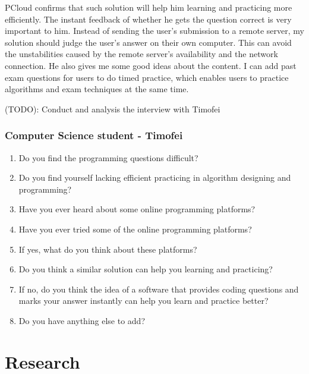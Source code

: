 \documentclass[a4paper]{report}
\begin{document}
PCloud confirms that such solution will help him learning and practicing more efficiently. The instant feedback of whether he gets the question correct is very important to him. Instead of sending the user's submission to a remote server, my solution should judge the user's answer on their own computer. This can avoid the unstabilities caused by the remote server's availability and the network connection. He also gives me some good ideas about the content. I can add past exam questions for users to do timed practice, which enables users to practice algorithms and exam techniques at the same time.

(TODO): Conduct and analysis the interview with Timofei

\subsubsection{Computer Science student - Timofei}

\begin{enumerate}

    \item Do you find the programming questions difficult?

    \item Do you find yourself lacking efficient practicing in algorithm designing and programming?

    \item Have you ever heard about some online programming platforms?

    \item Have you ever tried some of the online programming platforms?

    \item If yes, what do you think about these platforms?

    \item Do you think a similar solution can help you learning and practicing?

    \item If no, do you think the idea of a software that provides coding questions and marks your answer instantly can help you learn and practice better?

    \item Do you have anything else to add?

\end{enumerate}

\section{Research}
\end{document}
